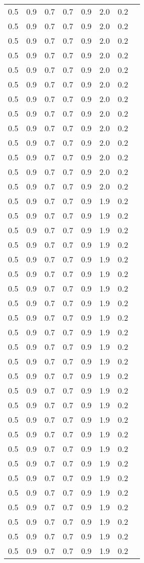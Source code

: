 \begin{tabular}{L{1in}|L{1in}|L{1in}|L{1in}|L{1in}|L{1in}|L{1in}|L{1in}}
0.5&0.9&0.7&0.7&0.9&2.0&0.2\\
0.5&0.9&0.7&0.7&0.9&2.0&0.2\\
0.5&0.9&0.7&0.7&0.9&2.0&0.2\\
0.5&0.9&0.7&0.7&0.9&2.0&0.2\\
0.5&0.9&0.7&0.7&0.9&2.0&0.2\\
0.5&0.9&0.7&0.7&0.9&2.0&0.2\\
0.5&0.9&0.7&0.7&0.9&2.0&0.2\\
0.5&0.9&0.7&0.7&0.9&2.0&0.2\\
0.5&0.9&0.7&0.7&0.9&2.0&0.2\\
0.5&0.9&0.7&0.7&0.9&2.0&0.2\\
0.5&0.9&0.7&0.7&0.9&2.0&0.2\\
0.5&0.9&0.7&0.7&0.9&2.0&0.2\\
0.5&0.9&0.7&0.7&0.9&2.0&0.2\\
0.5&0.9&0.7&0.7&0.9&1.9&0.2\\
0.5&0.9&0.7&0.7&0.9&1.9&0.2\\
0.5&0.9&0.7&0.7&0.9&1.9&0.2\\
0.5&0.9&0.7&0.7&0.9&1.9&0.2\\
0.5&0.9&0.7&0.7&0.9&1.9&0.2\\
0.5&0.9&0.7&0.7&0.9&1.9&0.2\\
0.5&0.9&0.7&0.7&0.9&1.9&0.2\\
0.5&0.9&0.7&0.7&0.9&1.9&0.2\\
0.5&0.9&0.7&0.7&0.9&1.9&0.2\\
0.5&0.9&0.7&0.7&0.9&1.9&0.2\\
0.5&0.9&0.7&0.7&0.9&1.9&0.2\\
0.5&0.9&0.7&0.7&0.9&1.9&0.2\\
0.5&0.9&0.7&0.7&0.9&1.9&0.2\\
0.5&0.9&0.7&0.7&0.9&1.9&0.2\\
0.5&0.9&0.7&0.7&0.9&1.9&0.2\\
0.5&0.9&0.7&0.7&0.9&1.9&0.2\\
0.5&0.9&0.7&0.7&0.9&1.9&0.2\\
0.5&0.9&0.7&0.7&0.9&1.9&0.2\\
0.5&0.9&0.7&0.7&0.9&1.9&0.2\\
0.5&0.9&0.7&0.7&0.9&1.9&0.2\\
0.5&0.9&0.7&0.7&0.9&1.9&0.2\\
0.5&0.9&0.7&0.7&0.9&1.9&0.2\\
0.5&0.9&0.7&0.7&0.9&1.9&0.2\\
0.5&0.9&0.7&0.7&0.9&1.9&0.2\\
0.5&0.9&0.7&0.7&0.9&1.9&0.2\\

\end{tabular}
